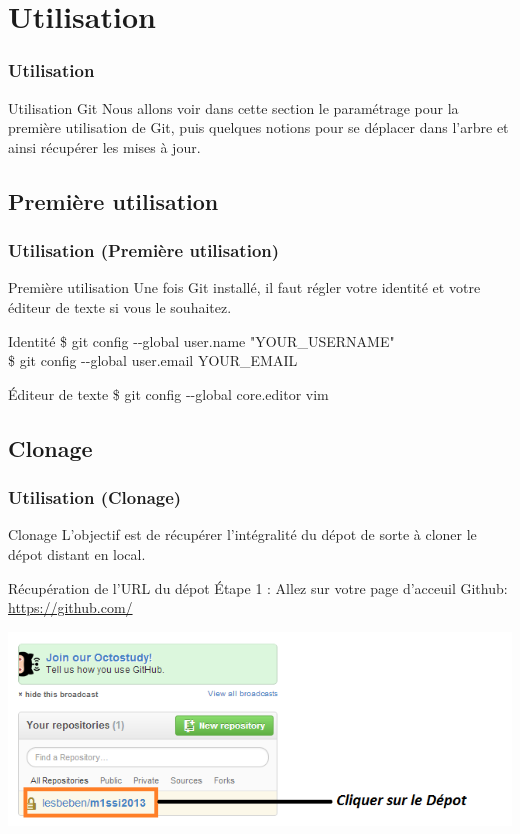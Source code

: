 \documentclass{beamer}
\begin{document}
\section{Utilisation}
\begin{frame}
\frametitle{Utilisation}
\begin{block}{Utilisation Git}
Nous allons voir dans cette section le param\'{e}trage pour la premi\`{e}re utilisation de Git, puis quelques notions pour se d\'{e}placer dans l'arbre et ainsi r\'{e}cup\'{e}rer les mises \`{a} jour.
\end{block}
\end{frame}

\subsection{Premi\`{e}re utilisation}
\begin{frame}
\frametitle{Utilisation (Premi\`{e}re utilisation)}
\begin{block}{Premi\`{e}re utilisation}
Une fois Git install\'{e}, il faut r\'{e}gler votre identit\'{e} et votre \'{e}diteur de texte si vous le souhaitez.
\end{block}

\begin{block}{Identit\'{e}}
\$ git config \--\--global user.name "YOUR\_USERNAME"\\
\$ git config \--\--global user.email YOUR\_EMAIL
\end{block}

\begin{block}{\'{E}diteur de texte}
\$ git config \--\--global core.editor vim
\end{block}
\end{frame}

\subsection{Clonage}
\begin{frame}
\frametitle{Utilisation (Clonage)}
\begin{block}{Clonage}
L'objectif est de r\'{e}cup\'{e}rer l'int\'{e}gralit\'{e} du d\'{e}pot de sorte \`{a} cloner le d\'{e}pot distant en local.
\end{block}

\begin{block}{R\'{e}cup\'{e}ration de l'URL du d\'{e}pot}
\'{E}tape 1 : Allez sur votre page d'acceuil Github:  \href{https://github.com/}{https://github.com/}
\end{block}
\includegraphics[scale=0.6]{githubhomedepot.png}
\end{frame}
\end{document}

